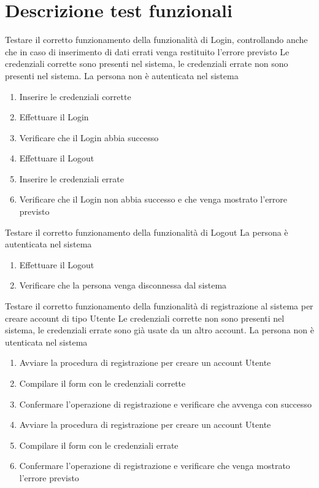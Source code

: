 \section{Descrizione test funzionali}
{Testare il corretto funzionamento della funzionalità di Login, controllando anche che in caso di inserimento di dati errati venga restituito l'errore previsto}
{Le credenziali corrette sono presenti nel sistema, le credenziali errate non sono presenti nel sistema. La persona non è autenticata nel sistema}
{\begin{enumerate}
	\item Inserire le credenziali corrette
	\item Effettuare il Login
	\item Verificare che il Login abbia successo
	\item Effettuare il Logout
	\item Inserire le credenziali errate
	\item Verificare che il Login non abbia successo e che venga mostrato l'errore previsto
\end{enumerate}
}


{Testare il corretto funzionamento della funzionalità di Logout}
{La persona è autenticata nel sistema}
{\begin{enumerate}
	\item Effettuare il Logout
	\item Verificare che la persona venga disconnessa dal sistema
\end{enumerate}
}


{Testare il corretto funzionamento della funzionalità di registrazione al sistema per creare account di tipo Utente}
{Le credenziali corrette non sono presenti nel sistema, le credenziali errate sono già usate da un altro account. La persona non è utenticata nel sistema}
{\begin{enumerate}
	\item Avviare la procedura di registrazione per creare un account Utente
	\item Compilare il form con le credenziali corrette
	\item Confermare l'operazione di registrazione e verificare che avvenga con successo
	\item Avviare la procedura di registrazione per creare un account Utente
	\item Compilare il form con le credenziali errate
	\item Confermare l'operazione di registrazione e verificare che venga mostrato l'errore previsto
\end{enumerate}}

